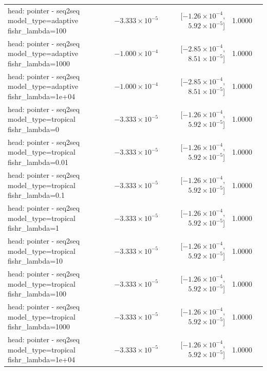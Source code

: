 \documentclass[10pt]{article}
\makeatletter
\newcommand{\stackcell}[1]{\begin{tabular}[t]{@{}l@{}}#1\end{tabular}}
\makeatother
\begin{document}
{\begin{longtable}{lrrrl}
\stackcell{head: pointer - seq2seq\\\footnotesize model\_type=adaptive fishr\_lambda=100 } & $-3.333\times10^{-5}$ & [$-1.26\times10^{-4}$, $5.92\times10^{-5}$] & 1.0000 & \\
\stackcell{head: pointer - seq2seq\\\footnotesize model\_type=adaptive fishr\_lambda=1000 } & $-1.000\times10^{-4}$ & [$-2.85\times10^{-4}$, $8.51\times10^{-5}$] & 1.0000 & \\
\stackcell{head: pointer - seq2seq\\\footnotesize model\_type=adaptive fishr\_lambda=1e+04 } & $-1.000\times10^{-4}$ & [$-2.85\times10^{-4}$, $8.51\times10^{-5}$] & 1.0000 & \\
\stackcell{head: pointer - seq2seq\\\footnotesize model\_type=tropical fishr\_lambda=0 } & $-3.333\times10^{-5}$ & [$-1.26\times10^{-4}$, $5.92\times10^{-5}$] & 1.0000 & \\
\stackcell{head: pointer - seq2seq\\\footnotesize model\_type=tropical fishr\_lambda=0.01 } & $-3.333\times10^{-5}$ & [$-1.26\times10^{-4}$, $5.92\times10^{-5}$] & 1.0000 & \\
\stackcell{head: pointer - seq2seq\\\footnotesize model\_type=tropical fishr\_lambda=0.1 } & $-3.333\times10^{-5}$ & [$-1.26\times10^{-4}$, $5.92\times10^{-5}$] & 1.0000 & \\
\stackcell{head: pointer - seq2seq\\\footnotesize model\_type=tropical fishr\_lambda=1 } & $-3.333\times10^{-5}$ & [$-1.26\times10^{-4}$, $5.92\times10^{-5}$] & 1.0000 & \\
\stackcell{head: pointer - seq2seq\\\footnotesize model\_type=tropical fishr\_lambda=10 } & $-3.333\times10^{-5}$ & [$-1.26\times10^{-4}$, $5.92\times10^{-5}$] & 1.0000 & \\
\stackcell{head: pointer - seq2seq\\\footnotesize model\_type=tropical fishr\_lambda=100 } & $-3.333\times10^{-5}$ & [$-1.26\times10^{-4}$, $5.92\times10^{-5}$] & 1.0000 & \\
\stackcell{head: pointer - seq2seq\\\footnotesize model\_type=tropical fishr\_lambda=1000 } & $-3.333\times10^{-5}$ & [$-1.26\times10^{-4}$, $5.92\times10^{-5}$] & 1.0000 & \\
\stackcell{head: pointer - seq2seq\\\footnotesize model\_type=tropical fishr\_lambda=1e+04 } & $-3.333\times10^{-5}$ & [$-1.26\times10^{-4}$, $5.92\times10^{-5}$] & 1.0000 & \\

\end{longtable}}
\end{document}
